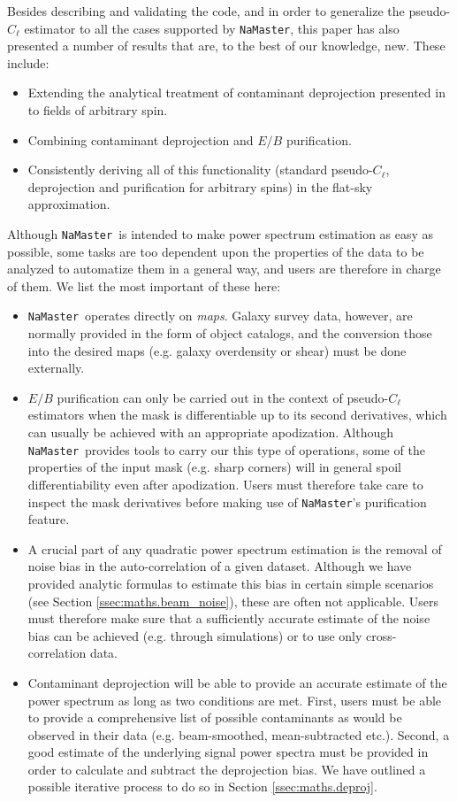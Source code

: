 \documentclass[usenatbib]{mnrasb}
\newcommand{\nmt}{{\tt NaMaster}}
\begin{document}
    Besides describing and validating the code, and in order to generalize the pseudo-$C_\ell$ estimator to all the cases supported by \nmt, this paper has also presented a number of results that are, to the best of our knowledge, new. These include:
    \begin{itemize}
      \item Extending the analytical treatment of contaminant deprojection presented in \cite{2016MNRAS.456.2095E} to fields of arbitrary spin.
      \item Combining contaminant deprojection and $E/B$ purification.
      \item Consistently deriving all of this functionality (standard pseudo-$C_\ell$, deprojection and purification for arbitrary spins) in the flat-sky approximation.
    \end{itemize}
    
    Although \nmt~is intended to make power spectrum estimation as easy as possible, some tasks are too dependent upon the properties of the data to be analyzed to automatize them in a general way, and users are therefore in charge of them. We list the most important of these here:
    \begin{itemize}
      \item \nmt~operates directly on {\sl maps}. Galaxy survey data, however, are normally provided in the form of object catalogs, and the conversion those into the desired maps (e.g. galaxy overdensity or shear) must be done externally. 
      \item $E/B$ purification can only be carried out in the context of pseudo-$C_\ell$ estimators when the mask is differentiable up to its second derivatives, which can usually be achieved with an appropriate apodization. Although \nmt~provides tools to carry our this type of operations, some of the properties of the input mask (e.g. sharp corners) will in general spoil differentiability even after apodization. Users must therefore take care to inspect the mask derivatives before making use of \nmt's purification feature.
      \item A crucial part of any quadratic power spectrum estimation is the removal of noise bias in the auto-correlation of a given dataset. Although we have provided analytic formulas to estimate this bias in certain simple scenarios (see Section \ref{ssec:maths.beam_noise}), these are often not applicable. Users must therefore make sure that a sufficiently accurate estimate of the noise bias can be achieved (e.g. through simulations) or to use only cross-correlation data.
      \item Contaminant deprojection will be able to provide an accurate estimate of the power spectrum as long as two conditions are met. First, users must be able to provide a comprehensive list of possible contaminants as would be observed in their data (e.g. beam-smoothed, mean-subtracted etc.). Second, a good estimate of the underlying signal power spectra must be provided in order to calculate and subtract the deprojection bias. We have outlined a possible iterative process to do so in Section \ref{ssec:maths.deproj}.
    \end{itemize}
\end{document}
